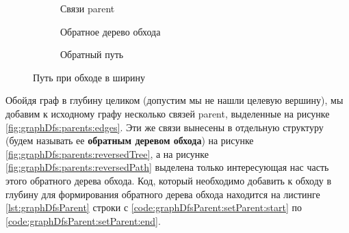 \documentclass[../../article.tex]{subfiles}
\begin{document}
\begin{figure*}
    \centering
    \begin{subfigure}{0.32\textwidth}
        \caption{Связи {\firacodebold parent}}
        \label{fig:graphBfs:parents:edges}
    \end{subfigure}
    \begin{subfigure}{0.32\textwidth}
        \caption{Обратное дерево обхода}
        \label{fig:graphBfs:parents:reversedTree}
    \end{subfigure}
    \begin{subfigure}{0.32\textwidth}
        \caption{Обратный путь}
        \label{fig:graphBfs:parents:reversedPath}
    \end{subfigure}
    \caption{Путь при обходе в ширину}
    \label{fig:graphBfs:parents}
\end{figure*}

Обойдя граф в глубину целиком (допустим мы не нашли целевую вершину), мы добавим к исходному графу несколько связей {\firacodebold parent}, выделенные на рисунке \ref{fig:graphDfs:parents:edges}. Эти же связи вынесены в отдельную структуру (будем называть ее {\bfseries обратным деревом обхода}) на рисунке \ref{fig:graphDfs:parents:reversedTree}, а на рисунке \ref{fig:graphDfs:parents:reversedPath} выделена только интересующая нас часть этого обратного дерева обхода. Код, который необходимо добавить к обходу в глубину для формирования обратного дерева обхода находится на листинге \ref{lst:graphDfsParent} строки с \ref{code:graphDfsParent:setParent:start} по \ref{code:graphDfsParent:setParent:end}.
\end{document}
